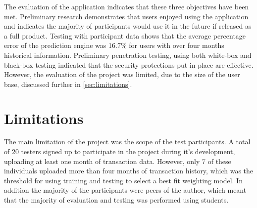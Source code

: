 The evaluation of the application indicates that these three objectives have been met. Preliminary research demonstrates that users enjoyed using the application and indicates the majority of participants would use it in the future if released as a full product. Testing with participant data shows that the average percentage error of the prediction engine was 16.7\% for users with over four months historical information. Preliminary penetration testing, using both white-box and black-box testing indicated that the security protections put in place are effective.  However, the evaluation of the project was limited, due to the size of the user base, discussed further in \autoref{sec:limitations}.




\section{Limitations} \label{sec:limitations}
The main limitation of the project was the scope of the test participants. A total of 20 testers signed up to participate in the project during it's development, uploading at least one month of transaction data. However, only 7 of these individuals uploaded more than four months of transaction history, which was the threshold for using training and testing to select a best fit weighting model. In addition the majority of the participants were peers of the author, which meant that the majority of evaluation and testing was performed using students.

